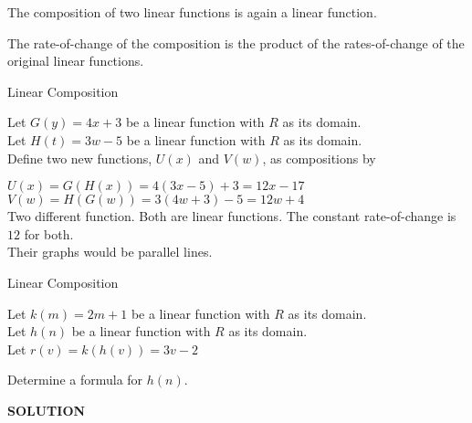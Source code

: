 \documentclass{ximera}
\begin{document}
The composition of two linear functions is again a linear function.

The rate-of-change of the composition is the product of the rates-of-change of the original linear functions.





\begin{example} Linear Composition

Let $G(y) = 4 x + 3$ be a linear function with \textbf{$R$} as its domain. \\
Let $H(t) = 3 w -5$ be a linear function with \textbf{$R$} as its domain. \\


Define two new functions, $U(x)$ and $V(w)$, as compositions by

$U(x) = G(H(x)) = 4 (3 x - 5) + 3 = 12 x -17$ \\
$V(w) = H(G(w)) = 3 (4 w + 3) - 5 = 12 w + 4$ \\


Two different function. Both are linear functions. The constant rate-of-change is $12$ for both. \\

Their graphs would be parallel lines.


\end{example}








\begin{example} Linear Composition

Let $k(m) = 2 m + 1$ be a linear function with \textbf{$R$} as its domain. \\
Let $h(n)$ be a linear function with \textbf{$R$} as its domain. \\


Let $r(v) = k(h(v)) = 3 v - 2$ 

Determine a formula for $h(n)$.




\textbf{\scriptsize{\textcolor{purple!50!blue!90!black}{SOLUTION}}}



\end{example}
\end{document}
